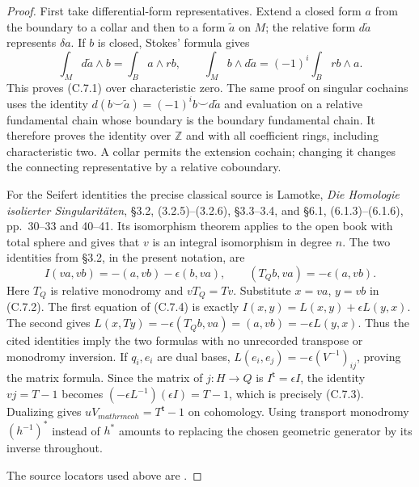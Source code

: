 \begin{proof}
First take differential-form representatives. Extend a closed form $a$
from the boundary to a collar and then to a form $\widetilde a$ on $M$;
the relative form $d\widetilde a$ represents $\delta a$. If $b$ is closed,
Stokes' formula gives
\[
 \int_M d\widetilde a\wedge b=\int_B a\wedge rb,
 \qquad
 \int_M b\wedge d\widetilde a=(-1)^i\int_B rb\wedge a.
\]
This proves (C.7.1) over characteristic zero. The same proof on singular
cochains uses the identity
$d(b\smile\widetilde a)=(-1)^i b\smile d\widetilde a$ and evaluation
on a relative fundamental chain whose boundary is the boundary
fundamental chain. It therefore proves the identity over $\mathbb Z$
and with all coefficient rings, including characteristic two. A collar
permits the extension cochain; changing it changes the connecting
representative by a relative coboundary.

For the Seifert identities the precise classical source is Lamotke,
\emph{Die Homologie isolierter Singularit\"aten}, \S3.2,
(3.2.5)--(3.2.6), \S3.3--3.4, and \S6.1,
(6.1.3)--(6.1.6), pp.~30--33 and 40--41.
Its isomorphism theorem applies to the open book with total sphere and
gives that $v$ is an integral isomorphism in degree $n$.
The two identities from \S3.2, in the present notation, are
\[
 I(va,vb)=-(a,vb)-\epsilon(b,va),\qquad
 (T_Qb,va)=-\epsilon(a,vb).
 \tag{C.7.4}
\]
Here $T_Q$ is relative monodromy and $vT_Q=Tv$.
Substitute $x=va$, $y=vb$ in (C.7.2).
The first equation of (C.7.4) is exactly
$I(x,y)=L(x,y)+\epsilon L(y,x)$.
The second gives
$L(x,Ty)=-\epsilon(T_Qb,va)=(a,vb)=-\epsilon L(y,x)$.
Thus the cited identities imply the two formulas with no unrecorded
transpose or monodromy inversion. If $q_i,e_i$ are dual bases,
$L(e_i,e_j)=-\epsilon(V^{-1})_{ij}$, proving the matrix formula.
Since the matrix of $j:H\to Q$ is $I^{\mathsf t}=\epsilon I$,
the identity $vj=T-1$ becomes
$(-\epsilon L^{-1})(\epsilon I)=T-1$, which is precisely (C.7.3).
Dualizing gives $uV_{mathrm{coh}}=T^{\mathsf t}-1$ on cohomology.
Using transport monodromy $(h^{-1})^*$ instead of $h^*$ amounts to
replacing the chosen geometric generator by its inverse throughout.

The source locators used above are \cite[3.1--3.4 and 6.1--6.2, pp.~29--33, 40--41]{C-lamotke1975}.
\end{proof}

